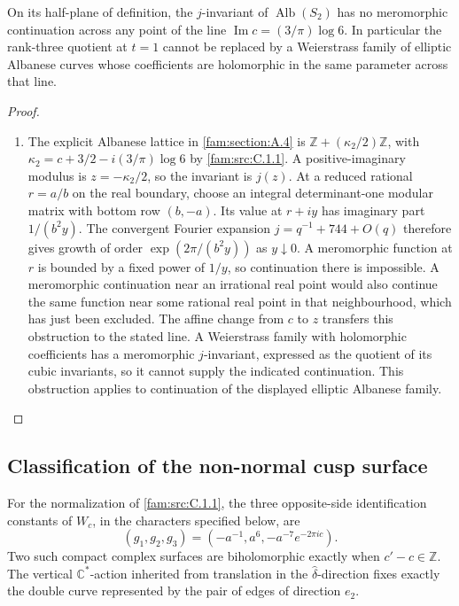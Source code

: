 \begin{proposition}\hypertarget{tag-01QP}{}\label{fam:src:C.3.4}\label{fam:st:C.3.4}

On its half-plane of definition, the $j$-invariant of
$\operatorname{Alb}(S_2)$ has no meromorphic continuation across any
point of the line
$\operatorname{Im}c=(3/\pi)\log6$. In particular the rank-three quotient
at $t=1$ cannot be replaced by a Weierstrass family of elliptic Albanese
curves whose coefficients are holomorphic in the same parameter across
that line.
\end{proposition}


\begin{proof}
\begin{enumerate}[label=\arabic*.,leftmargin=*]
\item The explicit Albanese lattice in \ref{fam:section:A.4} is
$\mathbb Z+(\kappa_2/2)\mathbb Z$, with
$\kappa_2=c+3/2-i(3/\pi)\log6$ by \ref{fam:src:C.1.1}. A positive-imaginary modulus is
$z=-\kappa_2/2$, so the invariant is $j(z)$. At a reduced rational
$r=a/b$ on the real boundary, choose an integral determinant-one modular
matrix with bottom row $(b,-a)$. Its value at $r+iy$ has imaginary part
$1/(b^2y)$. The convergent Fourier expansion $j=q^{-1}+744+O(q)$ therefore
gives growth of order $\exp(2\pi/(b^2y))$ as $y\downarrow0$.
A meromorphic function at $r$ is bounded by a fixed power of $1/y$,
so continuation there is impossible. A meromorphic continuation near an
irrational real point would also continue the same function near some
rational real point in that neighbourhood, which has just been excluded.
The affine change from $c$ to $z$ transfers this obstruction to the
stated line. A Weierstrass family with holomorphic coefficients has a
meromorphic $j$-invariant, expressed as the quotient of its cubic
invariants, so it cannot supply the indicated continuation. This
obstruction applies to continuation of the displayed elliptic Albanese
family.
\end{enumerate}
\end{proof}

\subsection{Classification of the non-normal cusp surface}\hypertarget{tag-01PO}{}\label{fam:section:C.4}
\begin{theorem}\hypertarget{tag-01QQ}{}\label{fam:src:C.4.1}\label{fam:st:C.4.1}

For the normalization of \ref{fam:src:C.1.1}, the three opposite-side identification
constants of \(W_c\), in the characters specified below, are
\[
 (g_1,g_2,g_3)=(-a^{-1},a^6,-a^{-7}e^{-2\pi ic}).
\]
Two such compact complex surfaces are biholomorphic exactly when
\(c'-c\in\mathbb Z\). The vertical \(\mathbb C^*\)-action inherited from
translation in the \(\widehat\delta\)-direction fixes exactly the double
curve represented by the pair of edges of direction \(e_2\).
\end{theorem}


